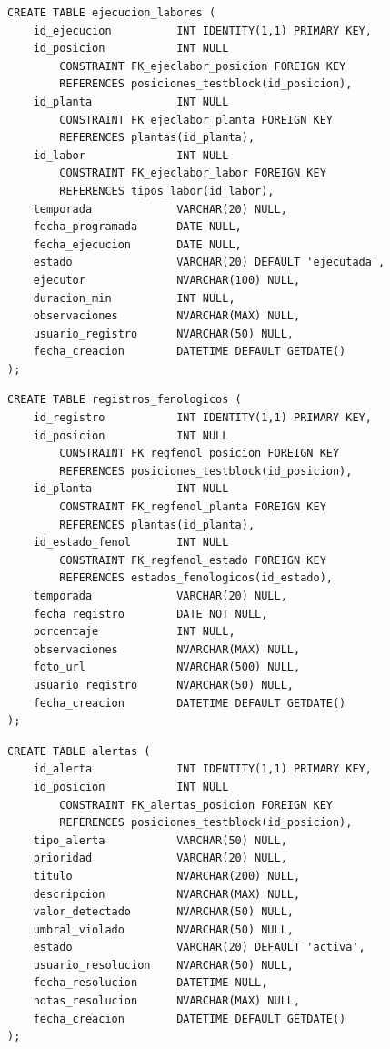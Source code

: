 \documentclass[12pt,a4paper,twoside]{report}
\begin{document}
\begin{lstlisting}[style=sqlstyle, caption={ejecucion\_labores}]
CREATE TABLE ejecucion_labores (
    id_ejecucion          INT IDENTITY(1,1) PRIMARY KEY,
    id_posicion           INT NULL
        CONSTRAINT FK_ejeclabor_posicion FOREIGN KEY
        REFERENCES posiciones_testblock(id_posicion),
    id_planta             INT NULL
        CONSTRAINT FK_ejeclabor_planta FOREIGN KEY
        REFERENCES plantas(id_planta),
    id_labor              INT NULL
        CONSTRAINT FK_ejeclabor_labor FOREIGN KEY
        REFERENCES tipos_labor(id_labor),
    temporada             VARCHAR(20) NULL,
    fecha_programada      DATE NULL,
    fecha_ejecucion       DATE NULL,
    estado                VARCHAR(20) DEFAULT 'ejecutada',
    ejecutor              NVARCHAR(100) NULL,
    duracion_min          INT NULL,
    observaciones         NVARCHAR(MAX) NULL,
    usuario_registro      NVARCHAR(50) NULL,
    fecha_creacion        DATETIME DEFAULT GETDATE()
);
\end{lstlisting}

\begin{lstlisting}[style=sqlstyle, caption={registros\_fenologicos}]
CREATE TABLE registros_fenologicos (
    id_registro           INT IDENTITY(1,1) PRIMARY KEY,
    id_posicion           INT NULL
        CONSTRAINT FK_regfenol_posicion FOREIGN KEY
        REFERENCES posiciones_testblock(id_posicion),
    id_planta             INT NULL
        CONSTRAINT FK_regfenol_planta FOREIGN KEY
        REFERENCES plantas(id_planta),
    id_estado_fenol       INT NULL
        CONSTRAINT FK_regfenol_estado FOREIGN KEY
        REFERENCES estados_fenologicos(id_estado),
    temporada             VARCHAR(20) NULL,
    fecha_registro        DATE NOT NULL,
    porcentaje            INT NULL,
    observaciones         NVARCHAR(MAX) NULL,
    foto_url              NVARCHAR(500) NULL,
    usuario_registro      NVARCHAR(50) NULL,
    fecha_creacion        DATETIME DEFAULT GETDATE()
);
\end{lstlisting}

\begin{lstlisting}[style=sqlstyle, caption={alertas}]
CREATE TABLE alertas (
    id_alerta             INT IDENTITY(1,1) PRIMARY KEY,
    id_posicion           INT NULL
        CONSTRAINT FK_alertas_posicion FOREIGN KEY
        REFERENCES posiciones_testblock(id_posicion),
    tipo_alerta           VARCHAR(50) NULL,
    prioridad             VARCHAR(20) NULL,
    titulo                NVARCHAR(200) NULL,
    descripcion           NVARCHAR(MAX) NULL,
    valor_detectado       NVARCHAR(50) NULL,
    umbral_violado        NVARCHAR(50) NULL,
    estado                VARCHAR(20) DEFAULT 'activa',
    usuario_resolucion    NVARCHAR(50) NULL,
    fecha_resolucion      DATETIME NULL,
    notas_resolucion      NVARCHAR(MAX) NULL,
    fecha_creacion        DATETIME DEFAULT GETDATE()
);
\end{lstlisting}
\end{document}
